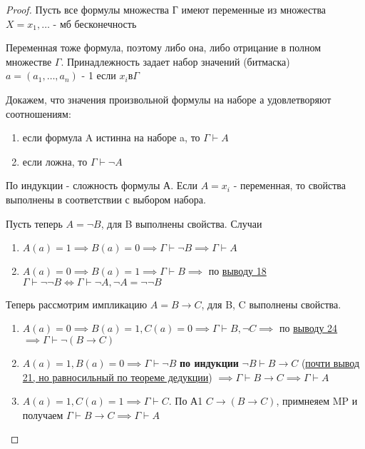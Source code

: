 \documentclass[a4paper]{article}
\theoremstyle{definition}
\theoremstyle{remark}
\begin{document}
    \begin{proof}
        Пусть все формулы множества Г имеют переменные из множества $X = {x_1, \dots}$ - мб бесконечность

        Переменная тоже формула, поэтому либо она, либо отрицание в полном множестве $\Gamma$.
        Принадлежность задает набор значений (битмаска) $a = (a_1, \dots, a_n)$ - 1 если $x_i в \Gamma$

        Докажем, что значения произвольной формулы на наборе а удовлетворяют соотношениям:
        \begin{enumerate}
            \item если формула A истинна на наборе a, то $\Gamma \vdash A$
            \item если ложна, то $\Gamma \vdash \neg A$
        \end{enumerate}
        По индукции - сложность формулы А. Если $A = x_i$ - переменная, то свойства выполнены в соответствии с выбором набора.

        Пусть теперь $A = \neg B$, для B выполнены свойства. Случаи
        \begin{enumerate}
            \item $A(a) = 1 \implies B(a) = 0\implies \Gamma \vdash \neg B\implies \Gamma \vdash A$
            \item $A(a) = 0 \implies B(a)= 1\implies \Gamma \vdash B\implies$ по \hyperlink{Вывод 18}{выводу 18}
            $\Gamma \vdash \neg \neg B\Leftrightarrow \Gamma \vdash \neg A, \neg A = \neg \neg B$
        \end{enumerate}
        Теперь рассмотрим импликацию $A = B\to C$, для B, C выполнены свойства.
        \begin{enumerate}
            \item $A(a) = 0\implies B(a) = 1, C(a) = 0\implies \Gamma \vdash B, \neg C\implies$ по \hyperlink{Вывод 24}{выводу 24} $\implies \Gamma \vdash \neg (B\to C)$
            \item $A(a) = 1, B(a) = 0\implies \Gamma \vdash \neg B$ \textbf{по индукции} $ \neg B \vdash B\to C$ 
            (\hyperlink{Вывод 21}{почти вывод 21, но равносильный по теореме дедукции})
            $\implies \Gamma \vdash B \to C\implies \Gamma \vdash A$
            \item $A(a) = 1, C(a) = 1 \implies \Gamma \vdash C.$ По А1 $C\to (B\to C)$, примнеяем MP и получаем $\Gamma \vdash B\to C\implies \Gamma\vdash A$
        \end{enumerate}
    \end{proof}
\end{document}
